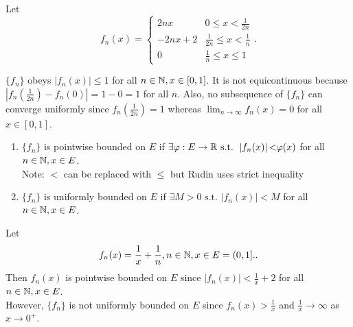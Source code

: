 \begin{example}
	Let \[
		f_{n}(x)=\begin{cases}
			2nx    & 0\le x< \frac{1}{2n}           \\
			-2nx+2 & \frac{1}{2n}\le x< \frac{1}{n} \\
			0      & \frac{1}{n}\le x\le 1
		\end{cases}
		.\]
	\begin{center}
	\end{center}
	$\{f_{n}\}$ obeys $\left|f_{n}(x)\right| \le 1$ for all $ n \in \mathbb{N}, x \in [0,1]$. It is not equicontinuous because $\left|f_{n}(\frac{1}{2n})-f_{n}(0)\right|=1-0=1$ for all $n$. Also, no subsequence of $\{f_{n}\} $ can converge uniformly since $f_{n}(\frac{1}{2n})=1$ whereas $\lim_{n\to \infty}{f_{n}(x)}=0$ for all $x \in [0,1]$.
\end{example}

\begin{define}[7.19]
	\label{def:7.19}
	\begin{enumerate}
		\item $\{f_{n}\}$ is pointwise bounded on $E$ if $\exists{\varphi: E\to \ensuremath{\mathbb{R}}} \text{ s.t. } \left|f_{n}(x)\right|{<} \varphi(x) $ for all $n \in \mathbb{N}, x \in E$.\\
		      Note: $<$ can be replaced with $\le $ but Rudin uses strict inequality
		\item $\{f_{n}\}$ is uniformly bounded on $E$ if $\exists{M>0} \text{ s.t. } \left|f_{n}(x)\right|<M$ for all $n \in \mathbb{N}, x \in E$.
	\end{enumerate}
\end{define}

\begin{example}
	Let \[
		f_{n}(x)=\frac{1}{x}+\frac{1}{n}, n \in \mathbb{N}, x \in E=(0,1].
		.\]
	Then $f_n(x)$ is pointwise bounded on $E$ since $\left|f_{n}(x)\right|<\frac{1}{x}+2$ for all $n \in \mathbb{N}, x \in E$.\\
	However, $\{f_{n}\}$ is not uniformly bounded on $E$ since $f_{n}(x)>\frac{1}{x}$ and $\frac{1}{x}\to \infty$ as $x\to 0^{+}$.
\end{example}

